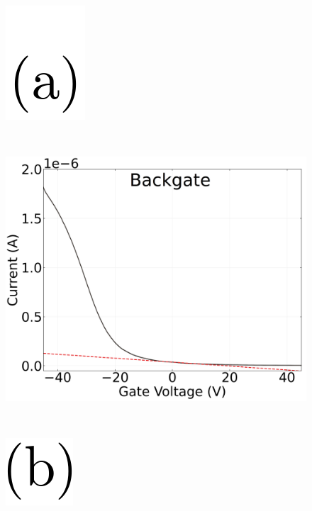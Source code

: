 \documentclass[
  letterpaper,
  DIV=11,
  numbers=noendperiod]{scrartcl}
\begin{document}
\begin{figure}

\begin{minipage}{0.03\linewidth}
\includegraphics{figures/(a).png}\end{minipage}%
%
\begin{minipage}{0.01\linewidth}
~\end{minipage}%
%
\begin{minipage}{0.45\linewidth}
\includegraphics{figures/ch2/Q5C10ch8transconductance.png}\end{minipage}%
%
\begin{minipage}{0.01\linewidth}
~\end{minipage}%
%
\begin{minipage}{0.03\linewidth}
\includegraphics{figures/(b).png}\end{minipage}%

\end{figure}
\end{document}

